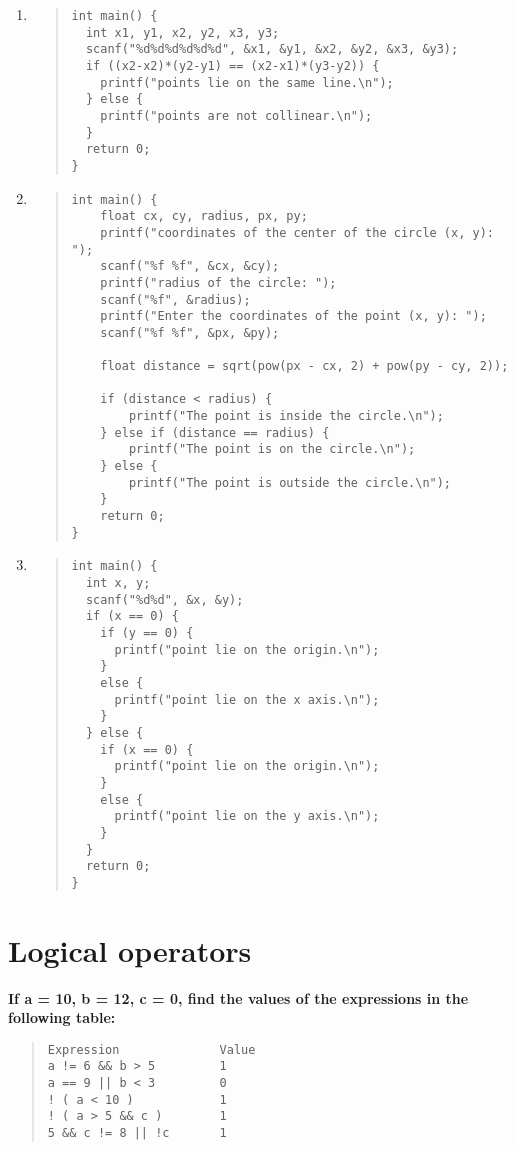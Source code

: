\documentclass{report}
\begin{document}
\begin{enumerate}
  \item \begin{quote} \begin{verbatim}
int main() {
  int x1, y1, x2, y2, x3, y3;
  scanf("%d%d%d%d%d%d", &x1, &y1, &x2, &y2, &x3, &y3);
  if ((x2-x2)*(y2-y1) == (x2-x1)*(y3-y2)) {
    printf("points lie on the same line.\n");
  } else {
    printf("points are not collinear.\n");
  }
  return 0;
}
  \end{verbatim} \end{quote} 

  \item \begin{quote} \begin{verbatim}
int main() {
    float cx, cy, radius, px, py;
    printf("coordinates of the center of the circle (x, y): ");
    scanf("%f %f", &cx, &cy);
    printf("radius of the circle: ");
    scanf("%f", &radius);
    printf("Enter the coordinates of the point (x, y): ");
    scanf("%f %f", &px, &py);

    float distance = sqrt(pow(px - cx, 2) + pow(py - cy, 2));

    if (distance < radius) {
        printf("The point is inside the circle.\n");
    } else if (distance == radius) {
        printf("The point is on the circle.\n");
    } else {
        printf("The point is outside the circle.\n");
    }
    return 0;
}
  \end{verbatim} \end{quote} 

  \item \begin{quote} \begin{verbatim}
int main() {
  int x, y;
  scanf("%d%d", &x, &y);
  if (x == 0) {
    if (y == 0) {
      printf("point lie on the origin.\n");
    }
    else {
      printf("point lie on the x axis.\n");
    }
  } else {
    if (x == 0) {
      printf("point lie on the origin.\n");
    }
    else {
      printf("point lie on the y axis.\n");
    }
  }
  return 0;
}
  \end{verbatim} \end{quote} 
\end{enumerate}

\section*{Logical operators}

\textbf{If a = 10, b = 12, c = 0, find the values of the expressions in the following table:}
\begin{quote} \begin{verbatim}
Expression              Value 
a != 6 && b > 5         1
a == 9 || b < 3         0
! ( a < 10 )            1
! ( a > 5 && c )        1 
5 && c != 8 || !c       1
\end{verbatim} \end{quote}
\end{document}
